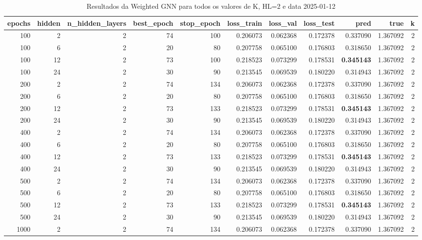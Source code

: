 \begin{table}
\caption{Resultados da Weighted GNN para todos os valores de K, HL=2 e data 2025-01-12}
\label{tab:weighted_gnn_results_allk_hl2_d20250112}
\begin{tabular}{rrrrrrrrrrr}
\toprule
epochs & hidden & n\_hidden\_layers & best\_epoch & stop\_epoch & loss\_train & loss\_val & loss\_test & pred & true & k \\
\midrule
100 & 2 & 2 & 74 & 100 & 0.206073 & 0.062368 & 0.172378 & 0.337090 & 1.367092 & 2 \\
100 & 6 & 2 & 20 & 80 & 0.207758 & 0.065100 & 0.176803 & 0.318650 & 1.367092 & 2 \\
100 & 12 & 2 & 73 & 100 & 0.218523 & 0.073299 & 0.178531 & \textbf{0.345143} & 1.367092 & 2 \\
100 & 24 & 2 & 30 & 90 & 0.213545 & 0.069539 & 0.180220 & 0.314943 & 1.367092 & 2 \\
200 & 2 & 2 & 74 & 134 & 0.206073 & 0.062368 & 0.172378 & 0.337090 & 1.367092 & 2 \\
200 & 6 & 2 & 20 & 80 & 0.207758 & 0.065100 & 0.176803 & 0.318650 & 1.367092 & 2 \\
200 & 12 & 2 & 73 & 133 & 0.218523 & 0.073299 & 0.178531 & \textbf{0.345143} & 1.367092 & 2 \\
200 & 24 & 2 & 30 & 90 & 0.213545 & 0.069539 & 0.180220 & 0.314943 & 1.367092 & 2 \\
400 & 2 & 2 & 74 & 134 & 0.206073 & 0.062368 & 0.172378 & 0.337090 & 1.367092 & 2 \\
400 & 6 & 2 & 20 & 80 & 0.207758 & 0.065100 & 0.176803 & 0.318650 & 1.367092 & 2 \\
400 & 12 & 2 & 73 & 133 & 0.218523 & 0.073299 & 0.178531 & \textbf{0.345143} & 1.367092 & 2 \\
400 & 24 & 2 & 30 & 90 & 0.213545 & 0.069539 & 0.180220 & 0.314943 & 1.367092 & 2 \\
500 & 2 & 2 & 74 & 134 & 0.206073 & 0.062368 & 0.172378 & 0.337090 & 1.367092 & 2 \\
500 & 6 & 2 & 20 & 80 & 0.207758 & 0.065100 & 0.176803 & 0.318650 & 1.367092 & 2 \\
500 & 12 & 2 & 73 & 133 & 0.218523 & 0.073299 & 0.178531 & \textbf{0.345143} & 1.367092 & 2 \\
500 & 24 & 2 & 30 & 90 & 0.213545 & 0.069539 & 0.180220 & 0.314943 & 1.367092 & 2 \\
1000 & 2 & 2 & 74 & 134 & 0.206073 & 0.062368 & 0.172378 & 0.337090 & 1.367092 & 2 \\

\end{tabular}
\end{table}
